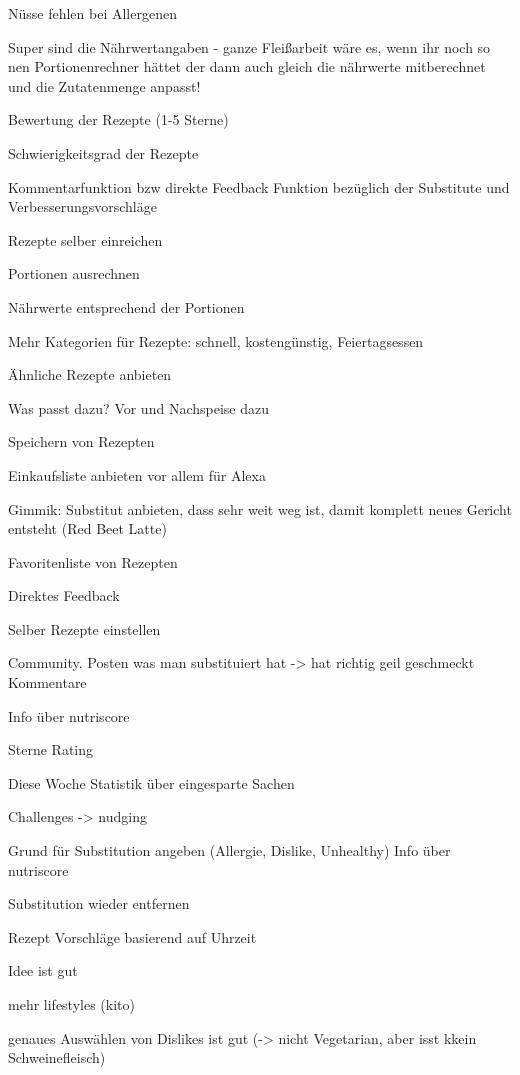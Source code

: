     Nüsse fehlen bei Allergenen
    
        Super sind die Nährwertangaben - ganze Fleißarbeit wäre es, wenn ihr noch so nen Portionenrechner hättet der dann auch gleich die nährwerte mitberechnet und die Zutatenmenge anpasst!
        
        Bewertung der Rezepte (1-5 Sterne)
        
    Schwierigkeitsgrad der Rezepte
    
    Kommentarfunktion bzw direkte Feedback Funktion bezüglich der Substitute und Verbesserungsvorschläge
    
    Rezepte selber einreichen
    
    Portionen ausrechnen
    
    Nährwerte entsprechend der Portionen
    
    Mehr Kategorien für Rezepte: schnell, kostengünstig, Feiertagsessen
    
    Ähnliche Rezepte anbieten
    
    Was passt dazu? Vor und Nachspeise dazu
    
    Speichern von Rezepten
    
    Einkaufsliste anbieten vor allem für Alexa
    
    Gimmik: Substitut anbieten, dass sehr weit weg ist, damit komplett neues Gericht entsteht (Red Beet Latte)
    
    Favoritenliste von Rezepten
    
    Direktes Feedback 
    
    Selber Rezepte einstellen
    
    Community. Posten was man substituiert hat -> hat richtig geil geschmeckt
    Kommentare
    
    Info über nutriscore
    
    Sterne Rating 

Diese Woche Statistik über eingesparte Sachen

    Challenges -> nudging
    
    Grund für Substitution angeben (Allergie, Dislike, Unhealthy)
    Info über nutriscore
    
     Substitution wieder entfernen
     
      Rezept Vorschläge basierend auf Uhrzeit 
      
      Idee ist gut
      
      mehr lifestyles (kito)
      
genaues Auswählen von Dislikes ist gut (-> nicht Vegetarian, aber isst kkein Schweinefleisch)

